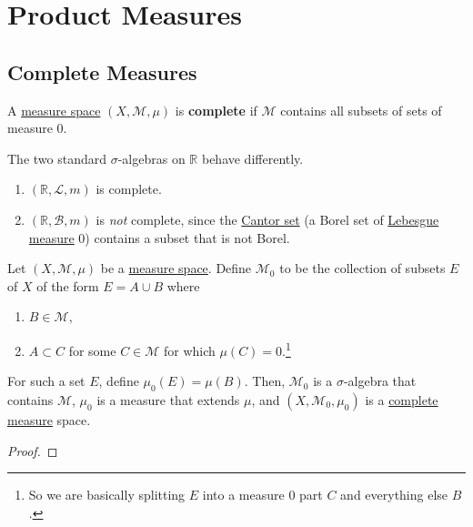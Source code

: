 \section{Product Measures} 

\subsection{Complete Measures}

  \begin{definition}
    \label{def:complete-measure-spaces}
    A \hyperref[def:measure-space]{measure space} $(X, \mathcal{M}, \mu)$ is \textbf{complete} if $\mathcal{M}$ contains all subsets of sets of measure $0$. 
  \end{definition}

  \begin{example}
    \label{ex:completeness-of-standard-measure-spaces}
    The two standard $\sigma$-algebras on $\mathbb{R}$ behave differently. 
    \begin{enumerate}
      \item $(\mathbb{R}, \mathcal{L}, m)$ is complete. 
      \item $(\mathbb{R}, \mathcal{B}, m)$ is \textit{not} complete, since the \hyperref[ex:cantor-set-is-measurable]{Cantor set} (a Borel set of \hyperref[def:lebesgue-measure]{Lebesgue measure} $0$) contains a subset that is not Borel. 
    \end{enumerate}
  \end{example}

  \begin{theorem}
    \label{thm:every-measure-space-can-be-completed}
    Let $(X, \mathcal{M}, \mu)$ be a \hyperref[def:measure-space]{measure space}. Define $\mathcal{M}_0$ to be the collection of subsets $E$ of $X$ of the form $E = A \cup B$ where 
    \begin{enumerate}
      \item $B \in \mathcal{M}$, 
      \item $A \subset C$ for some $C \in \mathcal{M}$ for which $\mu(C) = 0$.\footnote{So we are basically splitting $E$ into a measure $0$ part $C$ and everything else $B$.}
    \end{enumerate}
    For such a set $E$, define $\mu_0 (E) = \mu(B)$. Then, $\mathcal{M}_0$ is a $\sigma$-algebra that contains $\mathcal{M}$, $\mu_0$ is a measure that extends $\mu$, and $(X, \mathcal{M}_0, \mu_0)$ is a \hyperref[def:complete-measure]{complete measure} space. 
  \end{theorem}
  \begin{proof}
    
  \end{proof}

